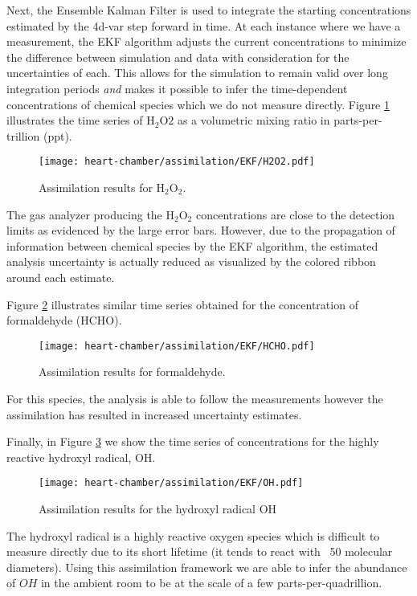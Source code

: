 Next, the Ensemble Kalman Filter is used to integrate the starting concentrations estimated by the 4d-var step forward in time. At each instance where we have a measurement, the EKF algorithm adjusts the current concentrations to minimize the difference between simulation and data with consideration for the uncertainties of each. This allows for the simulation to remain valid over long integration periods \textit{and} makes it possible to infer the time-dependent concentrations of chemical species which we do not measure directly. Figure \ref{fig:h2o2} illustrates the time series of $\mathrm{H_2O2}$  as a volumetric mixing ratio in parts-per-trillion (ppt).
\begin{figure}[!hbt]
  \centering
  \texttt{[image: heart-chamber/assimilation/EKF/H2O2.pdf]}
  \caption{Assimilation results for $\mathrm{H_2O_2}$.}
  \label{fig:h2o2}
\end{figure}
The gas analyzer producing the $\mathrm{H_2O_2}$ concentrations are close to the detection limits as evidenced by the large error bars. However, due to the propagation of information between chemical species by the EKF algorithm, the estimated analysis uncertainty is actually reduced as visualized by the colored ribbon around each estimate.

Figure \ref{fig:hcho} illustrates similar time series obtained for the concentration of formaldehyde ($\mathrm{HCHO}$).
\begin{figure}[!hbt]
  \centering
  \texttt{[image: heart-chamber/assimilation/EKF/HCHO.pdf]}
  \caption{Assimilation results for formaldehyde.}
  \label{fig:hcho}
\end{figure}
For this species, the analysis is able to follow the measurements however the assimilation has resulted in increased uncertainty estimates.


Finally, in Figure \ref{fig:oh} we show the time series of concentrations for the highly reactive hydroxyl radical, $\mathrm{OH}$.
\begin{figure}[!hbt]
  \centering
  \texttt{[image: heart-chamber/assimilation/EKF/OH.pdf]}
  \caption{Assimilation results for the hydroxyl radical $\mathrm{OH}$}
  \label{fig:oh}
\end{figure}
The hydroxyl radical is a highly reactive oxygen species which is difficult to measure directly due to its short lifetime (it tends to react with ~50 molecular diameters). Using this assimilation framework we are able to infer the abundance of $OH$ in the ambient room to be at the scale of a few parts-per-quadrillion.

